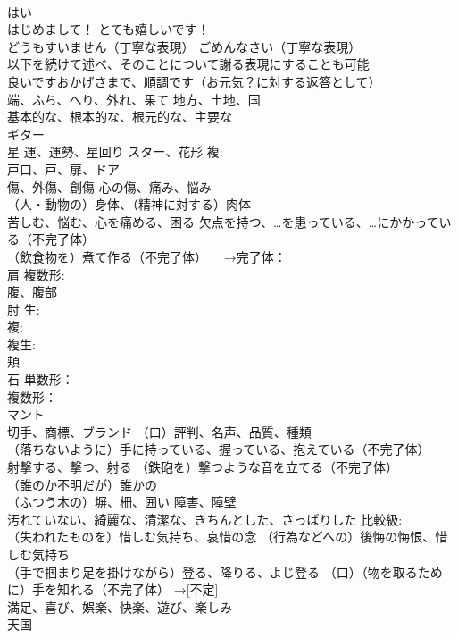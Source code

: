 \documentclass[8pt]{extreport}
\begin{document}
\begin{CJK}{UTF8}{min}
\\	はい
\\	はじめまして！ とても嬉しいです！
\\	どうもすいません（丁寧な表現） ごめんなさい（丁寧な表現） 
\\	以下を続けて述べ、そのことについて謝る表現にすることも可能
\\	良いですおかげさまで、順調です（お元気？に対する返答として）
\\	端、ふち、へり、外れ、果て 地方、土地、国
\\	基本的な、根本的な、根元的な、主要な
\\	ギター
\\	星 運、運勢、星回り スター、花形 複:
\\	戸口、戸、扉、ドア
\\	傷、外傷、創傷 心の傷、痛み、悩み
\\	（人・動物の）身体、（精神に対する）肉体
\\	苦しむ、悩む、心を痛める、困る 欠点を持つ、…を患っている、…にかかっている（不完了体）
\\	（飲食物を）煮て作る（不完了体） 　→完了体：
\\	肩 複数形:
\\	腹、腹部
\\	肘 生:
\\	複:
\\	複生:
\\	頬
\\	石 単数形：
\\	複数形：
\\	マント
\\	切手、商標、ブランド （口）評判、名声、品質、種類
\\	（落ちないように）手に持っている、握っている、抱えている（不完了体）
\\	射撃する、撃つ、射る （鉄砲を）撃つような音を立てる（不完了体）
\\	[不定]（誰のか不明だが）誰かの
\\	（ふつう木の）塀、柵、囲い 障害、障壁
\\	汚れていない、綺麗な、清潔な、きちんとした、さっぱりした 比較級:
\\	（失われたものを）惜しむ気持ち、哀惜の念 （行為などへの）後悔の悔恨、惜しむ気持ち
\\	[定]（手で掴まり足を掛けながら）登る、降りる、よじ登る （口）（物を取るために）手を知れる（不完了体） →[不定] 
\\	満足、喜び、娯楽、快楽、遊び、楽しみ
\\	天国

\end{CJK}
\end{document}
